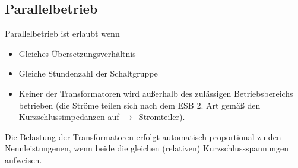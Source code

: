 \documentclass[11pt]{article}
\begin{document}
\subsection*{Parallelbetrieb}
\rmfamily
Parallelbetrieb ist erlaubt wenn
\begin{itemize}
\item Gleiches Übersetzungsverhältnis
\item Gleiche Stundenzahl der Schaltgruppe
\item Keiner der Transformatoren wird außerhalb des zulässigen Betriebsbereichs betrieben (die Ströme teilen sich nach dem ESB 2. Art gemäß den Kurzschlussimpedanzen auf \mbox{$\rightarrow$ Stromteiler}).
\end{itemize}
Die Belastung der Transformatoren erfolgt automatisch proportional zu den Nennleistungenen, wenn beide die gleichen (relativen) Kurzschlussspannungen aufweisen.
\end{document}
